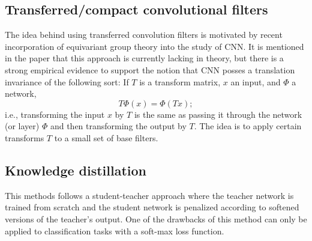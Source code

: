 \subsection{Transferred/compact convolutional filters}
The idea behind using transferred convolution filters is motivated by recent
incorporation of equivariant group theory into the study of CNN. It is mentioned
in the paper that this approach is currently lacking in theory, but there is a
strong empirical evidence to support the notion that CNN posses a translation
invariance of the following sort: If $T$ is a transform matrix, $x$ an input,
and $\Phi$ a network,
\begin{equation}\label{sum-1:eqv-gp-th}
  T\Phi(x)=\Phi(Tx);
\end{equation}
i.e., transforming the input $x$ by $T$ is the same as passing it through the
network (or layer) $\Phi$ and then transforming the output by $T$. The idea is
to apply certain transforms $T$ to a small set of base filters.

\subsection{Knowledge distillation}
This methods follows a student-teacher approach where the teacher network is
trained from scratch and the student network is penalized according to softened
versions of the teacher's output. One of the drawbacks of this method can only
be applied to classification tasks with a soft-max loss function.


